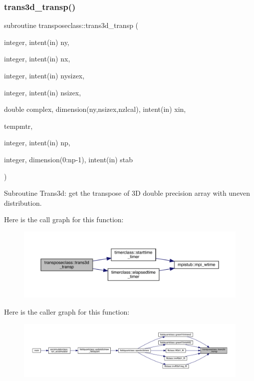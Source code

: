 \subsubsection{\texorpdfstring{trans3d\_transp()}{trans3d\_transp()}}
{\footnotesize\ttfamily subroutine transposeclass\+::trans3d\+\_\+transp (\begin{DoxyParamCaption}\item[{integer, intent(in)}]{ny,  }\item[{integer, intent(in)}]{nx,  }\item[{integer, intent(in)}]{nysizex,  }\item[{integer, intent(in)}]{nsizex,  }\item[{double complex, dimension(ny,nsizex,nzlcal), intent(in)}]{xin,  }\item[{}]{tempmtr,  }\item[{integer, intent(in)}]{np,  }\item[{integer, dimension(0\+:np-\/1), intent(in)}]{stab }\end{DoxyParamCaption})}



Subroutine Trans3d\+: get the transpose of 3D double precision array with uneven distribution. 

Here is the call graph for this function\+:
\nopagebreak
\begin{figure}[H]
\begin{center}
\leavevmode
\includegraphics[width=350pt]{namespacetransposeclass_a53eeae5e11acd8c39e03fb8672f2d90e_cgraph}
\end{center}
\end{figure}
Here is the caller graph for this function\+:
\nopagebreak
\begin{figure}[H]
\begin{center}
\leavevmode
\includegraphics[width=350pt]{namespacetransposeclass_a53eeae5e11acd8c39e03fb8672f2d90e_icgraph}
\end{center}
\end{figure}
